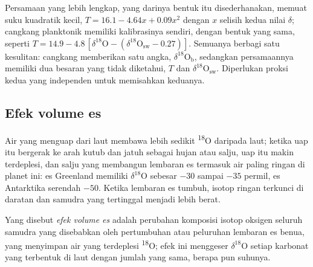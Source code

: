 Persamaan yang lebih lengkap, yang darinya bentuk itu disederhanakan, memuat suku kuadratik kecil,
$T = 16.1 - 4.64x + 0.09x^2$ dengan $x$ selisih kedua nilai $\delta$; cangkang planktonik
memiliki kalibrasinya sendiri, dengan bentuk yang sama, seperti $T = 14.9 - 4.8\,[\delta^{18}\mathrm{O} -
(\delta^{18}\mathrm{O}_{\mathrm{sw}} - 0.27)]$. Semuanya berbagi satu kesulitan: cangkang memberikan satu
angka, $\delta^{18}\mathrm{O}_{\mathrm{b}}$, sedangkan persamaannya memiliki dua besaran yang tidak diketahui, $T$ dan
$\delta^{18}\mathrm{O}_{\mathrm{sw}}$. Diperlukan proksi kedua yang independen untuk memisahkan keduanya.

\subsection*{Efek volume es}

Air yang menguap dari laut membawa lebih sedikit \textsuperscript{18}O daripada laut; ketika uap itu
bergerak ke arah kutub dan jatuh sebagai hujan atau salju, uap itu makin terdeplesi, dan salju yang membangun lembaran
es termasuk air paling ringan di planet ini: es Greenland memiliki $\delta^{18}$O sebesar $-30$ sampai $-35$
permil, es Antarktika serendah $-50$. Ketika lembaran es tumbuh, isotop ringan terkunci di daratan
dan samudra yang tertinggal menjadi lebih berat.

\begin{definition}\label{def:b2:climate-proxies:ice-volume}
Yang disebut \emph{efek volume es} adalah perubahan komposisi isotop oksigen
seluruh samudra yang disebabkan oleh pertumbuhan atau peluruhan lembaran es benua, yang
menyimpan air yang terdeplesi \textsuperscript{18}O; efek ini menggeser $\delta^{18}$O setiap karbonat
yang terbentuk di laut dengan jumlah yang sama, berapa pun suhunya.
\end{definition}

